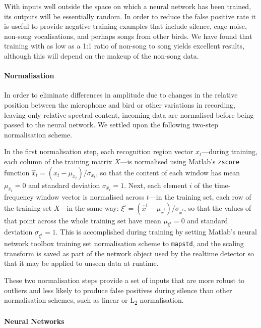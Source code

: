 \documentclass[10pt,letterpaper]{article}
\renewcommand{\subsubsection}[1]{\paragraph{#1}}
\begin{document}
With inputs well outside the space on which a neural network has been
trained, its outputs will be essentially random. In order to reduce
the false positive rate it is useful to provide negative training
examples that include silence, cage noise, non-song vocalisations, and
perhaps songs from other birds.  We have found that training with
as low as a 1:1 ratio of non-song to song yields excellent results,
although this will depend on the makeup of the non-song data.

\subsubsection{Normalisation}

In order to eliminate differences in amplitude due to changes in the relative position between the microphone and bird or other
variations in recording, leaving only relative spectral content, incoming data are normalised before being passed to the neural network.  We settled upon the following two-step normalisation scheme.

In the first normalisation step, each recognition region vector $x_t$---during training, each column of the training matrix $X$---is normalised using Matlab's {\tt zscore} function $\hat{x}_t = (x_t - \mu_{x_t}) / \sigma_{x_t}$, so that the content of each window has mean $\mu_{\hat{x}_t}=0$ and  standard deviation $\sigma_{\hat{x}_t}=1$.  Next, each element $i$ of the time-frequency window vector is normalised across $t$---in the training set, each row of the training set $X$---in the same way: $\xi^i = (\hat{x}^i - \mu_{\hat{x}^i})/\sigma_{\hat{x}^i}$, so that the values of that point across the whole training set have mean $\mu_{\xi^i}=0$ and standard deviation $\sigma_{\xi^i}=1$.  This is accomplished during training by setting Matlab's neural network toolbox training set normalisation scheme to {\tt mapstd}, and the scaling transform is saved as part of the network object used by the realtime detector so that it may be applied to unseen data at runtime.

These two normalisation steps provide a set of inputs that are more
robust to outliers and less likely to produce false positives during 
silence than other normalisation schemes, such as 
linear or L\textsubscript{2} normalisation.

\subsubsection{Neural Networks}
\end{document}
